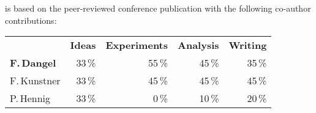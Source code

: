 \begin{disclaimer}
   is based on the peer-reviewed
  conference publication with the following co-author contributions:

   \cite{dangel2020backpack}

  \vspace{-1.75ex}

  \begin{center}
    \begin{tabular}[!h]{lrrrr}
      & \textbf{Ideas} & \textbf{Experiments} & \textbf{Analysis} & \textbf{Writing}
      \\
      \textbf{F.\,Dangel} & 33\,\% & 55\,\% & 45\,\% & 35\,\%
      \\
      F.\,Kunstner & 33\,\%& 45\,\% & 45\,\% & 45\,\%
      \\
      P.\,Hennig & 33\,\% & 0\,\% & 10\,\% & 20\,\%
    \end{tabular}
  \end{center}
\end{disclaimer}


